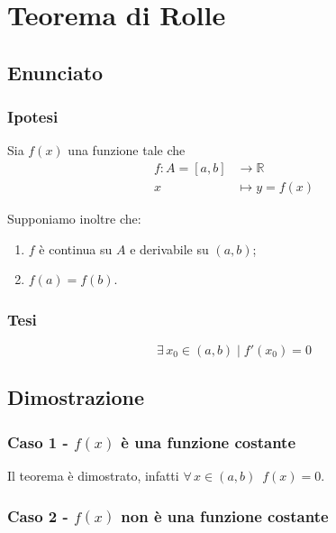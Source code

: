 \documentclass[../dimostrazioni]{subfiles}
\begin{document}
    \chapter{Teorema di Rolle}
    \label{teoRolle}

        \section*{Enunciato}

            \subsection*{Ipotesi}

                Sia \(f(x)\) una funzione tale che
                \begin{align*}
                    f : A = [a, b] &\longrightarrow \mathbb{R}\\
                    x &\longmapsto y = f(x) 
                \end{align*}

                Supponiamo inoltre che:

                \begin{enumerate}
                    \indentitem \item \(f\) è continua su \(A\) e derivabile su \((a, b)\);
                    \indentitem \item \(f(a) = f(b)\).
                \end{enumerate}

            \subsection*{Tesi}

                \[\exists \, x_0 \in (a,b) \; | \; f'(x_0) = 0 \]

        \section*{Dimostrazione}

            \subsection*{Caso 1 - \(f(x)\) è una funzione costante}

            Il teorema è dimostrato, infatti \(\forall \, x \in (a,b) \, \, \, f(x) = 0\).

            \subsection*{Caso 2 - \(f(x)\) non è una funzione costante}
\end{document}
